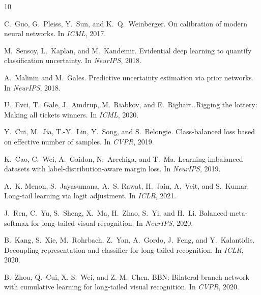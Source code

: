 \documentclass[letterpaper]{article} %
\begin{document}
\begin{thebibliography}{10}\itemsep=-1pt

C.~Guo, G.~Pleiss, Y.~Sun, and K.~Q.~Weinberger.
\newblock On calibration of modern neural networks.
\newblock In {\em ICML}, 2017.

M.~Sensoy, L.~Kaplan, and M.~Kandemir.
\newblock Evidential deep learning to quantify classification uncertainty.
\newblock In {\em NeurIPS}, 2018.

A.~Malinin and M.~Gales.
\newblock Predictive uncertainty estimation via prior networks.
\newblock In {\em NeurIPS}, 2018.

U.~Evci, T.~Gale, J.~Amdrup, M.~Riabkov, and E.~Righart.
\newblock Rigging the lottery: Making all tickets winners.
\newblock In {\em ICML}, 2020.

Y.~Cui, M.~Jia, T.-Y.~Lin, Y.~Song, and S.~Belongie.
\newblock Class-balanced loss based on effective number of samples.
\newblock In {\em CVPR}, 2019.

K.~Cao, C.~Wei, A.~Gaidon, N.~Arechiga, and T.~Ma.
\newblock Learning imbalanced datasets with label-distribution-aware margin loss.
\newblock In {\em NeurIPS}, 2019.

A.~K. Menon, S.~Jayasumana, A.~S. Rawat, H.~Jain, A.~Veit, and S.~Kumar.
\newblock Long-tail learning via logit adjustment.
\newblock In {\em ICLR}, 2021.

J.~Ren, C.~Yu, S.~Sheng, X.~Ma, H.~Zhao, S.~Yi, and H.~Li.
\newblock Balanced meta-softmax for long-tailed visual recognition.
\newblock In {\em NeurIPS}, 2020.

B.~Kang, S.~Xie, M.~Rohrbach, Z.~Yan, A.~Gordo, J.~Feng, and Y.~Kalantidis.
\newblock Decoupling representation and classifier for long-tailed recognition.
\newblock In {\em ICLR}, 2020.

B.~Zhou, Q.~Cui, X.-S.~Wei, and Z.-M.~Chen.
\newblock BBN: Bilateral-branch network with cumulative learning for long-tailed visual recognition.
\newblock In {\em CVPR}, 2020.


\end{thebibliography}
\end{document}
